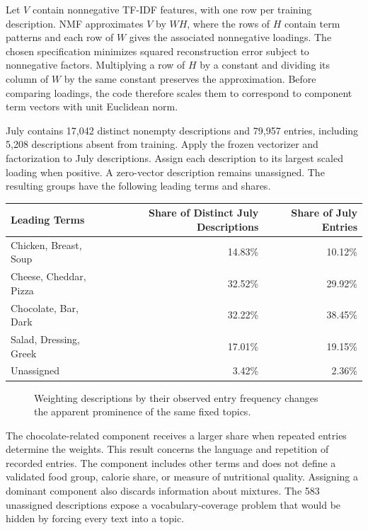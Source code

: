 Let \(V\) contain nonnegative TF-IDF features, with one row per training
description. NMF approximates \(V\) by \(WH\), where the rows of \(H\)
contain term patterns and each row of \(W\) gives the associated
nonnegative loadings. The chosen specification minimizes squared
reconstruction error subject to nonnegative factors. Multiplying a row
of \(H\) by a constant and dividing its column of \(W\) by the same
constant preserves the approximation. Before comparing loadings, the
code therefore scales them to correspond to component term vectors with
unit Euclidean norm.

July contains 17,042 distinct nonempty descriptions and 79,957 entries,
including 5,208 descriptions absent from training. Apply the frozen
vectorizer and factorization to July descriptions. Assign each
description to its largest scaled loading when positive. A zero-vector
description remains unassigned. The resulting groups have the following
leading terms and shares.

\begin{table}[H]
\centering\small
\begin{tabular}{@{}lrr@{}}
\toprule
Leading Terms & Share of Distinct July Descriptions & Share of July
Entries \\
\midrule

Chicken, Breast, Soup & 14.83\% & 10.12\% \\
Cheese, Cheddar, Pizza & 32.52\% & 29.92\% \\
Chocolate, Bar, Dark & 32.22\% & 38.45\% \\
Salad, Dressing, Greek & 17.01\% & 19.15\% \\
Unassigned & 3.42\% & 2.36\% \\
\bottomrule
\end{tabular}
\end{table}

\begin{figure}[htbp]
\centering

\caption{Weighting descriptions by their observed entry frequency changes the apparent prominence of the same fixed topics.}\label{fig:M05_topic_denominators}
\end{figure}

The chocolate-related component receives a larger share when repeated
entries determine the weights. This result concerns the language and
repetition of recorded entries. The component includes other terms and
does not define a validated food group, calorie share, or measure of
nutritional quality. Assigning a dominant component also discards
information about mixtures. The 583 unassigned descriptions expose a
vocabulary-coverage problem that would be hidden by forcing every text
into a topic.

